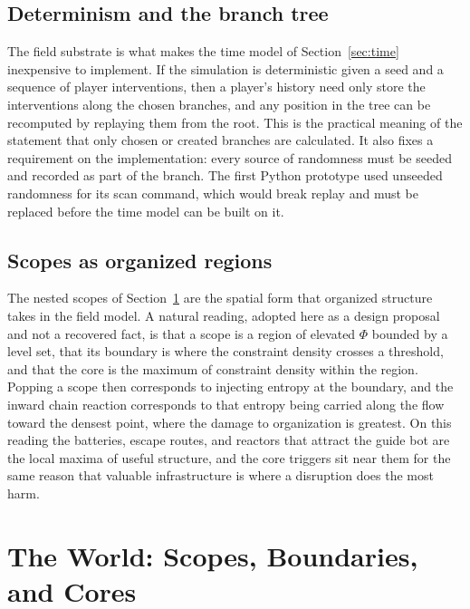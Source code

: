 \documentclass[11pt]{article}
\begin{document}
\subsection{Determinism and the branch tree}

The field substrate is what makes the time model of Section~\ref{sec:time} inexpensive to implement. If the simulation is deterministic given a seed and a sequence of player interventions, then a player's history need only store the interventions along the chosen branches, and any position in the tree can be recomputed by replaying them from the root. This is the practical meaning of the statement that only chosen or created branches are calculated. It also fixes a requirement on the implementation: every source of randomness must be seeded and recorded as part of the branch. The first Python prototype used unseeded randomness for its scan command, which would break replay and must be replaced before the time model can be built on it.

\subsection{Scopes as organized regions}

The nested scopes of Section~\ref{sec:world} are the spatial form that organized structure takes in the field model. A natural reading, adopted here as a design proposal and not a recovered fact, is that a scope is a region of elevated $\Phi$ bounded by a level set, that its boundary is where the constraint density crosses a threshold, and that the core is the maximum of constraint density within the region. Popping a scope then corresponds to injecting entropy at the boundary, and the inward chain reaction corresponds to that entropy being carried along the flow toward the densest point, where the damage to organization is greatest. On this reading the batteries, escape routes, and reactors that attract the guide bot are the local maxima of useful structure, and the core triggers sit near them for the same reason that valuable infrastructure is where a disruption does the most harm.

\section{The World: Scopes, Boundaries, and Cores}
\label{sec:world}
\end{document}
